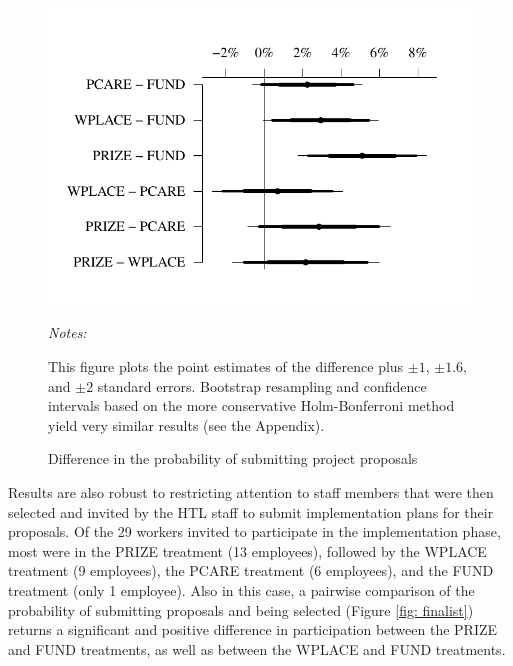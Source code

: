 \documentclass[12pt, titlepage]{article}
\newenvironment{tablenotes}[1][]{
  \begin{minipage}{\textwidth}\emph{Notes:}{\footnotesize #1}
}{\end{minipage}}
\begin{document}
\begin{figure}
  \centering
  \caption{Difference in the probability of submitting project proposals}
  \label{fig: submitting}
  \includegraphics{Figures/cplot-1.pdf}
  \begin{tablenotes}
  This figure plots the point estimates of the difference plus $\pm 1$, $\pm 1.6$, and $\pm 2$ standard errors. Bootstrap resampling and confidence intervals based on the more conservative Holm-Bonferroni method yield very similar results (see the Appendix).
  \end{tablenotes}
\end{figure}

Results are also robust to restricting attention to staff members that
were then selected and invited by the HTL staff to submit implementation
plans for their proposals. Of the 29 workers invited to participate in
the implementation phase, most were in the PRIZE treatment (13
employees), followed by the WPLACE treatment (9 employees), the PCARE
treatment (6 employees), and the FUND treatment (only 1 employee). Also
in this case, a pairwise comparison of the probability of submitting
proposals and being selected (Figure \ref{fig: finalist}) returns a
significant and positive difference in participation between the PRIZE
and FUND treatments, as well as between the WPLACE and FUND treatments.
\end{document}
